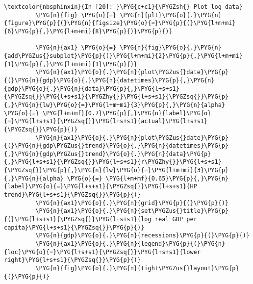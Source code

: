 \documentclass[letterpaper,10pt,openany,oneside,english]{sphinxmanual}
\begin{document}
%
\begin{Verbatim}[commandchars=\\\{\}]
\textcolor{nbsphinxin}{In [20]: }\PYG{c+c1}{\PYGZsh{} Plot log data}
         \PYG{n}{fig} \PYG{o}{=} \PYG{n}{plt}\PYG{o}{.}\PYG{n}{figure}\PYG{p}{(}\PYG{n}{figsize}\PYG{o}{=}\PYG{p}{(}\PYG{l+m+mi}{6}\PYG{p}{,}\PYG{l+m+mi}{8}\PYG{p}{)}\PYG{p}{)}
         
         \PYG{n}{ax1} \PYG{o}{=} \PYG{n}{fig}\PYG{o}{.}\PYG{n}{add\PYGZus{}subplot}\PYG{p}{(}\PYG{l+m+mi}{2}\PYG{p}{,}\PYG{l+m+mi}{1}\PYG{p}{,}\PYG{l+m+mi}{1}\PYG{p}{)}
         \PYG{n}{ax1}\PYG{o}{.}\PYG{n}{plot\PYGZus{}date}\PYG{p}{(}\PYG{n}{gdp}\PYG{o}{.}\PYG{n}{datetimes}\PYG{p}{,}\PYG{n}{gdp}\PYG{o}{.}\PYG{n}{data}\PYG{p}{,}\PYG{l+s+s1}{\PYGZsq{}}\PYG{l+s+s1}{\PYGZhy{}}\PYG{l+s+s1}{\PYGZsq{}}\PYG{p}{,}\PYG{n}{lw}\PYG{o}{=}\PYG{l+m+mi}{3}\PYG{p}{,}\PYG{n}{alpha} \PYG{o}{=} \PYG{l+m+mf}{0.7}\PYG{p}{,}\PYG{n}{label}\PYG{o}{=}\PYG{l+s+s1}{\PYGZsq{}}\PYG{l+s+s1}{actual}\PYG{l+s+s1}{\PYGZsq{}}\PYG{p}{)}
         \PYG{n}{ax1}\PYG{o}{.}\PYG{n}{plot\PYGZus{}date}\PYG{p}{(}\PYG{n}{gdp\PYGZus{}trend}\PYG{o}{.}\PYG{n}{datetimes}\PYG{p}{,}\PYG{n}{gdp\PYGZus{}trend}\PYG{o}{.}\PYG{n}{data}\PYG{p}{,}\PYG{l+s+s1}{\PYGZsq{}}\PYG{l+s+s1}{r\PYGZhy{}}\PYG{l+s+s1}{\PYGZsq{}}\PYG{p}{,}\PYG{n}{lw}\PYG{o}{=}\PYG{l+m+mi}{3}\PYG{p}{,}\PYG{n}{alpha} \PYG{o}{=} \PYG{l+m+mf}{0.65}\PYG{p}{,}\PYG{n}{label}\PYG{o}{=}\PYG{l+s+s1}{\PYGZsq{}}\PYG{l+s+s1}{HP trend}\PYG{l+s+s1}{\PYGZsq{}}\PYG{p}{)}
         \PYG{n}{ax1}\PYG{o}{.}\PYG{n}{grid}\PYG{p}{(}\PYG{p}{)}
         \PYG{n}{ax1}\PYG{o}{.}\PYG{n}{set\PYGZus{}title}\PYG{p}{(}\PYG{l+s+s1}{\PYGZsq{}}\PYG{l+s+s1}{log real GDP per capita}\PYG{l+s+s1}{\PYGZsq{}}\PYG{p}{)}
         \PYG{n}{gdp}\PYG{o}{.}\PYG{n}{recessions}\PYG{p}{(}\PYG{p}{)}
         \PYG{n}{ax1}\PYG{o}{.}\PYG{n}{legend}\PYG{p}{(}\PYG{n}{loc}\PYG{o}{=}\PYG{l+s+s1}{\PYGZsq{}}\PYG{l+s+s1}{lower right}\PYG{l+s+s1}{\PYGZsq{}}\PYG{p}{)}
         \PYG{n}{fig}\PYG{o}{.}\PYG{n}{tight\PYGZus{}layout}\PYG{p}{(}\PYG{p}{)}
         

\end{Verbatim}
\end{document}
